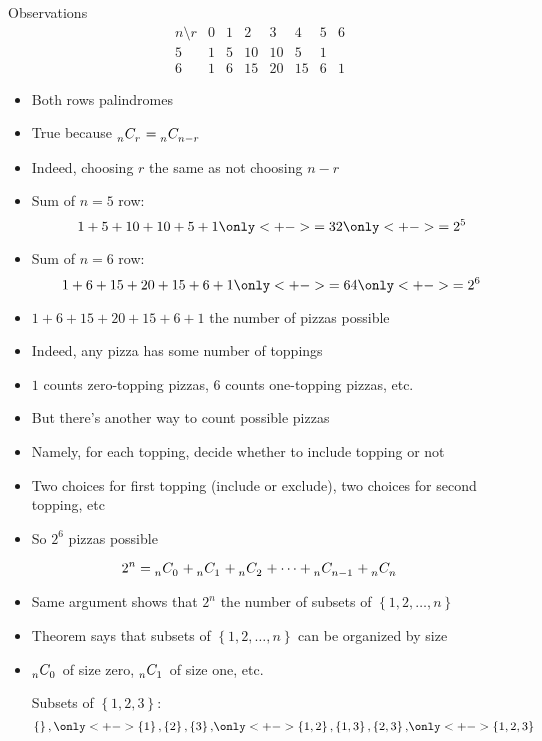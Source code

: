 \documentclass[handout]{beamer}
\theoremstyle{definition}
\newcommand\ncr[2]{\tensor[_{#1}]C{_{#2}}}
\begin{document}
\begin{frame}{Observations}
\[\begin{array}{c|ccccccc}
n\setminus r&0&1&2&3&4&5&6\\\hline
5&1&5&10&10&5&1\\
6&1&6&15&20&15&6&1
\end{array}\]
\begin{itemize}
\item Both rows palindromes
\item True because $\ncr{n}{r}=\ncr{n}{n-r}$
\item Indeed, choosing $r$ the same as \alert{not} choosing $n-r$
\item Sum of $n=5$ row:
\[1+5+10+10+5+1\only<+->{=32}\only<+->{=2^5}\]
\item Sum of $n=6$ row:
\[1+6+15+20+15+6+1\only<+->{=64}\only<+->{=2^6}\]
\end{itemize}
\end{frame}

\begin{frame}
\begin{itemize}
\item $1+6+15+20+15+6+1$ the number of pizzas possible
\item Indeed, any pizza has \alert{some} number of toppings
\item $1$ counts zero-topping pizzas, $6$ counts one-topping pizzas, etc.
\item But there's another way to count possible pizzas
\item Namely, for each topping, decide whether to include topping or not
\item Two choices for first topping (include or exclude), two choices for second
topping, etc
\item So $2^6$ pizzas possible
\end{itemize}
\end{frame}

\begin{frame}
\begin{theorem}
\[2^n=\ncr{n}{0}+\ncr{n}{1}+\ncr{n}{2}+\cdots+\ncr{n}{n-1}+\ncr{n}{n}\]
\end{theorem}
\begin{itemize}
\item Same argument shows that $2^n$ the number
of subsets of $\left\{1,2,\ldots,n\right\}$
\item Theorem says that
subsets of $\left\{1,2,\ldots,n\right\}$
can be organized by size
\item $\ncr{n}{0}$ of size zero, $\ncr{n}{1}$ of size one, etc.
\begin{example}
Subsets of $\left\{1,2,3\right\}$:
\[\left\{\right\},
\only<+->{\left\{1\right\},\left\{2\right\},\left\{3\right\},}
\only<+->{\left\{1,2\right\},\left\{1,3\right\},\left\{2,3\right\},}
\only<+->{\left\{1,2,3\right\}}\]
\end{example}
\end{itemize}
\end{frame}
\end{document}
